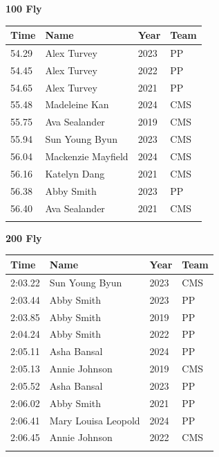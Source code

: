 \vspace{1.2em}
\noindent\begin{minipage}[t]{0.98\textwidth}
\centering
\textbf{\textcolor{teamprimary}{100 Fly}}\par
\vspace{0.5em}
\centering
\small
\renewcommand{\arraystretch}{1.0}
\setlength{\tabcolsep}{4pt}
\begin{tabular}{@{}p{2.5cm}p{4.5cm}p{1.5cm}p{2.5cm}@{}}
\toprule
\textbf{Time} & \textbf{Name} & \textbf{Year} & \textbf{Team} \\
\midrule
54.29 & Alex Turvey & 2023 & PP \\
54.45 & Alex Turvey & 2022 & PP \\
54.65 & Alex Turvey & 2021 & PP \\
55.48 & Madeleine Kan & 2024 & CMS \\
55.75 & Ava Sealander & 2019 & CMS \\
55.94 & Sun Young Byun & 2023 & CMS \\
56.04 & Mackenzie Mayfield & 2024 & CMS \\
56.16 & Katelyn Dang & 2021 & CMS \\
56.38 & Abby Smith & 2023 & PP \\
56.40 & Ava Sealander & 2021 & CMS \\
\bottomrule
\vspace{0.5em}
\end{tabular}
\end{minipage}
\vspace{1.2em}
\noindent\begin{minipage}[t]{0.98\textwidth}
\centering
\textbf{\textcolor{teamprimary}{200 Fly}}\par
\vspace{0.5em}
\centering
\small
\renewcommand{\arraystretch}{1.0}
\setlength{\tabcolsep}{4pt}
\begin{tabular}{@{}p{2.5cm}p{4.5cm}p{1.5cm}p{2.5cm}@{}}
\toprule
\textbf{Time} & \textbf{Name} & \textbf{Year} & \textbf{Team} \\
\midrule
2:03.22 & Sun Young Byun & 2023 & CMS \\
2:03.44 & Abby Smith & 2023 & PP \\
2:03.85 & Abby Smith & 2019 & PP \\
2:04.24 & Abby Smith & 2022 & PP \\
2:05.11 & Asha Bansal & 2024 & PP \\
2:05.13 & Annie Johnson & 2019 & CMS \\
2:05.52 & Asha Bansal & 2023 & PP \\
2:06.02 & Abby Smith & 2021 & PP \\
2:06.41 & Mary Louisa Leopold & 2024 & PP \\
2:06.45 & Annie Johnson & 2022 & CMS \\
\bottomrule
\vspace{0.5em}
\end{tabular}
\end{minipage}
